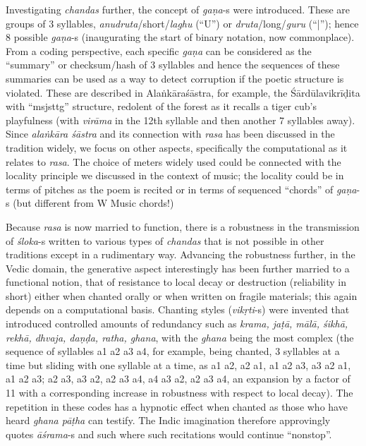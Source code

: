 Investigating \textsl{chandas} further, the concept of \textsl{gaṇa}-s were introduced. These are groups of 3 syllables, \textsl{anudruta}/short/\textsl{laghu} (“U”) or \textsl{druta}/long/\textsl{guru} (“|”); hence 8 possible \textsl{gaṇa}-s (inaugurating the start of binary notation, now commonplace). From a coding perspective, each specific \textsl{gaṇa} can be considered as the “summary” or checksum/hash of 3 syllables and hence the sequences of these summaries can be used as a way to detect corruption if the poetic structure is violated. These are described in Alaṅkāraśāstra, for example, the Śārdūlavikrīḍita with “msjsttg” structure, redolent of the forest as it recalls a tiger cub’s playfulness (with \textsl{virāma} in the 12th syllable and then another 7 syllables away). Since \textsl{alaṅkāra śāstra} and its connection with \textsl{rasa} has been discussed in the tradition widely, we focus on other aspects, specifically the computational as it relates to \textsl{rasa}. The choice of meters widely used could be connected with the locality principle we discussed in the context of music; the locality could be in terms of pitches as the poem is recited or in terms of sequenced “chords” of \textsl{gaṇa}-s (but different from W Music chords!)

Because \textsl{rasa} is now married to function, there is a robustness in the transmission of \textsl{śloka}-s written to various types of \textsl{chandas} that is not possible in other traditions except in a rudimentary way. Advancing the robustness further, in the Vedic domain, the generative aspect interestingly has been further married to a functional notion, that of resistance to local decay or destruction (reliability in short) either when chanted orally or when written on fragile materials; this again depends on a computational basis. Chanting styles (\textsl{vikṛti}-s) were invented that introduced controlled amounts of redundancy such as \textsl{krama, jaṭā, mālā, śikhā, rekhā, dhvaja, daṇḍa, ratha, ghana}, with the \textsl{ghana} being the most complex (the sequence of syllables a1 a2 a3 a4, for example, being chanted, 3 syllables at a time but sliding with one syllable at a time, as a1 a2, a2 a1, a1 a2 a3, a3 a2 a1, a1 a2 a3; a2 a3, a3 a2, a2 a3 a4, a4 a3 a2, a2 a3 a4, an expansion by a factor of 11 with a corresponding increase in robustness with respect to local decay). The repetition in these codes has a hypnotic effect when chanted as those who have heard \textsl{ghana pāṭha} can testify. The Indic imagination therefore approvingly quotes \textsl{āśrama}-s and such where such recitations would continue “nonstop”.

